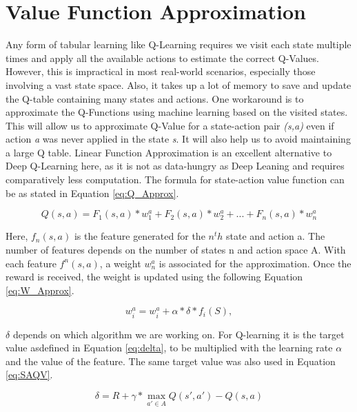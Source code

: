 \documentclass[logo,msc]{infthesis}           %
\begin{document}
\section{Value Function Approximation}

Any form of tabular learning like Q-Learning requires we visit each state multiple times and apply all the available actions to estimate the correct Q-Values. However, this is impractical in most real-world scenarios, especially those involving a vast state space. Also, it takes up a lot of memory to save and update the Q-table containing many states and actions. One workaround is to approximate the Q-Functions using machine learning based on the visited states\cite{580874}. This will allow us to approximate Q-Value for a state-action pair \textit{(s,a)} even if action \textit{a} was never applied in the state \textit{s}. It will also help us to avoid maintaining a large Q table. Linear Function Approximation \cite{VF} is an excellent alternative to Deep Q-Learning here, as it is not as data-hungry as Deep Leaning and requires comparatively less computation. The formula for state-action value function can be as stated in Equation \ref{eq:Q_Approx}.

\begin{equation}
Q(s,a) = F_1(s,a) * w_1^a + F_2(s,a) * w_2^a + ... + F_n(s,a) * w_n^a 
\label{eq:Q_Approx}
\end{equation}

Here, \(f_n(s,a)\) is the feature generated for the \(n^th\) state and action a. The number of features depends on the number of states n and action space A. With each feature \(f^n(s,a)\), a weight \(w_n^a\) is associated for the approximation. Once the reward is received, the weight is updated using the following Equation \ref{eq:W_Approx}.

\begin{equation}
w_i^a = w_i^a  + {\alpha} * {\delta} * f_i(S),
\label{eq:W_Approx}
\end{equation}

\(\delta\) depends on which algorithm we are working on. For Q-learning it is the target value asdefined in Equation \ref{eq:delta}, to be multiplied with the learning rate \(\alpha\) and the value of the feature. The same target value was also used in Equation \ref{eq:SAQV}.

\begin{equation}
{\delta} = R + {\gamma} * \max_{a' \in A} Q(s',a') - Q(s,a)
\label{eq:delta}
\end{equation}
\end{document}
